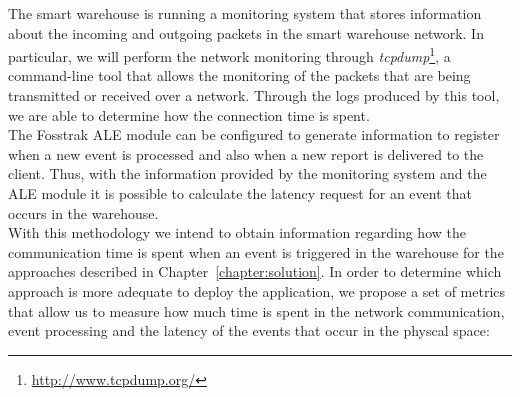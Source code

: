 The smart warehouse is running a monitoring system that stores information about the incoming and outgoing
packets in the smart warehouse network. In particular, we will perform the network monitoring through
\textit{tcpdump}\footnote{\url{http://www.tcpdump.org/}}, a command-line tool that allows the monitoring
of the packets that are being transmitted or received over a network. Through the logs produced by this tool,
we are able to determine how the connection time is spent.\\

The Fosstrak \gls{ALE} module can be configured to generate information to register when a new event
is processed and also when a new report is delivered to the client. Thus, with the information provided
by the monitoring system and the \gls{ALE} module it is possible to calculate the latency request for
an event that occurs in the warehouse.\\

With this methodology we intend to obtain information regarding how the communication time is spent
when an event is triggered in the warehouse for the approaches described in Chapter~\ref{chapter:solution}.
In order to determine which approach is more adequate to deploy the application, we propose a set of
metrics that allow us to measure how much time is spent in the network communication, event processing
and the latency of the events that occur in the physcal space:

